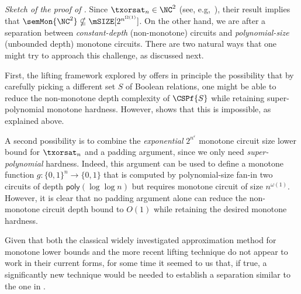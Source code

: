 \documentclass[11pt]{article}
\begin{document}
\noindent \emph{Sketch of the proof of  .} Since $\txorsat_n \in \NC^2$ (see, e.g,~\citep{gkrs19}), their result implies that 
$\semMon{\NC^2} \nsubseteq \mSIZE[2^{n^{\Omega(1)}}]$. On the
other hand, we are after a separation between \emph{constant-depth}
(non-monotone) circuits and \emph{polynomial-size} (unbounded depth)
monotone circuits. There are two natural ways that one might try to
approach this challenge, as discussed next.

First, the lifting framework explored by \citep{gkrs19} offers in principle the possibility that by carefully picking a different set $S$ of Boolean relations, one might be able to reduce the non-monotone depth complexity of $\CSPf{S}$ while retaining super-polynomial monotone hardness. However,  shows that this is impossible, as explained above. 

A second possibility is to combine the \emph{exponential} $2^{n^\varepsilon}$ monotone circuit size lower bound for  $\txorsat_n$ and a padding argument, since we only need \emph{super-polynomial} hardness. Indeed, this argument can be used to define a monotone function $g \colon \{0,1\}^n \to \{0,1\}$ that is computed by polynomial-size fan-in two circuits of depth $\mathsf{poly}(\log \log n)$ but requires monotone circuit of size $n^{\omega(1)}$. However, it is clear that no padding argument alone can reduce the non-monotone circuit depth bound to $O(1)$ while retaining the desired monotone hardness. 

Given that both the classical widely investigated approximation method for monotone lower bounds and the more recent lifting technique do not appear to work in their current forms, for some time it seemed to us that, if true, a significantly new technique would be needed to establish a separation similar to the one in . 
\end{document}
